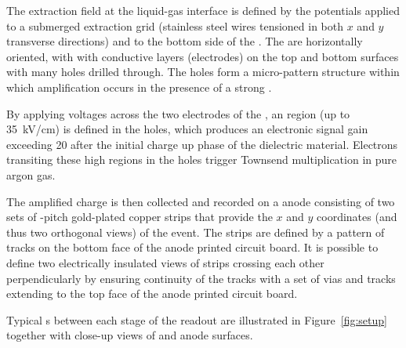 The extraction field at the liquid-gas interface is defined by the potentials applied to a submerged extraction grid (stainless steel wires tensioned in both $x$ and $y$ transverse directions) and to the bottom side of the . The  are horizontally oriented, with  with conductive layers (electrodes) on the top and bottom surfaces with many holes drilled through.  The holes form a micro-pattern structure within which amplification occurs in the presence of a strong \efield.

By applying voltages across the two electrodes of the , an \efield region (up to \SI{35}{kV/cm}) is defined in the holes, which produces an electronic signal gain exceeding \num{20} after the initial charge up phase of the  dielectric material.  Electrons transiting these high \efield regions in the holes trigger Townsend multiplication in pure argon gas.

The amplified charge is then collected and recorded on a \twod anode consisting of two sets of \dpstrippitch-pitch gold-plated copper strips that provide the $x$ and $y$ coordinates (and thus two orthogonal views) of the event. The strips are defined by a pattern of tracks on the bottom face of the anode printed circuit board. It is possible  to define two electrically insulated views of strips crossing each other perpendicularly by ensuring continuity of the tracks with a set of vias and tracks extending to the top face of the anode printed circuit board.

Typical \efield{}s between each stage of the readout are
illustrated in Figure~\ref{fig:setup} together with close-up views of  and anode surfaces. 

